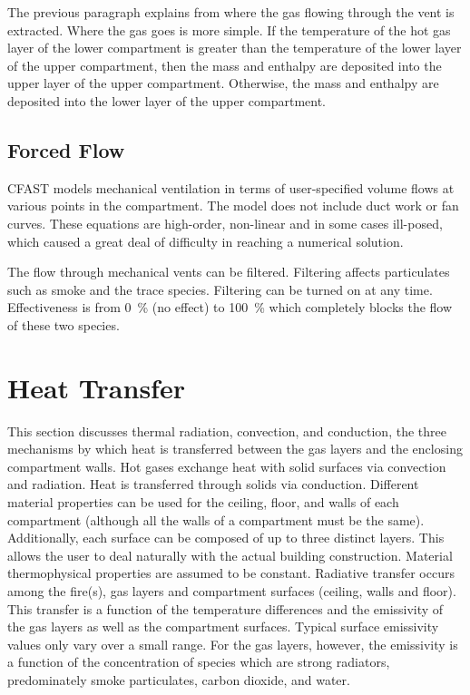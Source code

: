\documentclass[12pt]{book}
\begin{document}
The previous paragraph explains from where the gas flowing through the vent is extracted. Where the gas goes is more simple. If the temperature of the hot gas layer of the lower compartment is greater than the temperature of the lower layer of the upper compartment, then the mass and enthalpy are deposited into the upper layer of the upper compartment. Otherwise, the mass and enthalpy are deposited into the lower layer of the upper compartment.


\section{Forced Flow}

CFAST models mechanical ventilation in terms of user-specified volume flows at various points in the compartment. The model does not include duct work or fan curves. These equations are high-order, non-linear and in some cases ill-posed, which caused a great deal of difficulty in reaching a numerical solution.

The flow through mechanical vents can be filtered. Filtering affects particulates such as smoke and the trace species. Filtering can be turned on at any time. Effectiveness is from 0~\% (no effect) to 100~\% which completely blocks the flow of these two species.





\chapter{Heat Transfer}

This section discusses thermal radiation, convection, and conduction, the three mechanisms by which heat is transferred between the gas layers and the enclosing compartment walls. Hot gases exchange heat with solid surfaces via convection and radiation. Heat is transferred through solids via conduction. Different material properties can be used for the ceiling, floor, and walls of each compartment (although all the walls of a compartment must be the same).  Additionally, each surface can be composed of up to three distinct layers.  This allows the user to deal naturally with the actual building construction.  Material thermophysical properties are assumed to be constant. Radiative transfer occurs among the fire(s), gas layers and compartment surfaces (ceiling, walls and floor).  This transfer is a function of the temperature differences and the emissivity of the gas layers as well as the compartment surfaces.  Typical surface emissivity values only vary over a small range.  For the gas layers, however, the emissivity is a function of the concentration of species which are strong radiators, predominately smoke particulates, carbon dioxide, and water.
\end{document}
